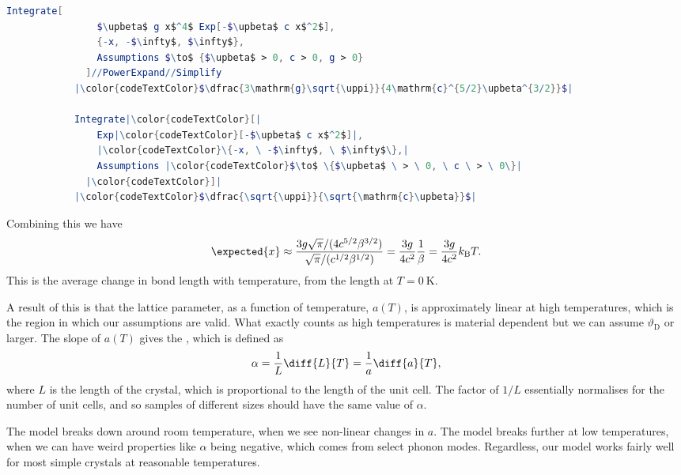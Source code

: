 \documentclass[fleqn]{NotesClass}
\newcommand*{\boltzmann}{k_{\mathrm{B}}}
\newcommand*{\debye}{\mathrm{D}}
\begin{document}
    \begin{cde}{}{}
        \begin{lstlisting}[gobble=12, language=mathematica, mathescape=true,escapechar=|]
            Integrate[
                $\upbeta$ g x$^4$ Exp[-$\upbeta$ c x$^2$],
                {-x, -$\infty$, $\infty$},
                Assumptions $\to$ {$\upbeta$ > 0, c > 0, g > 0}
              ]//PowerExpand//Simplify
            |\color{codeTextColor}$\dfrac{3\mathrm{g}\sqrt{\uppi}}{4\mathrm{c}^{5/2}\upbeta^{3/2}}$|
            
            Integrate|\color{codeTextColor}[|
                Exp|\color{codeTextColor}[-$\upbeta$ c x$^2$]|,
                |\color{codeTextColor}\{-x, \ -$\infty$, \ $\infty$\},|
                Assumptions |\color{codeTextColor}$\to$ \{$\upbeta$ \ > \ 0, \ c \ > \ 0\}|
              |\color{codeTextColor}]|
            |\color{codeTextColor}$\dfrac{\sqrt{\uppi}}{\sqrt{\mathrm{c}\upbeta}}$|
        \end{lstlisting}
    \end{cde}
    
    Combining this we have
    \begin{equation}
        \expected{x} \approx \frac{3g\sqrt{\pi}/(4c^{5/2}\beta^{3/2})}{\sqrt{\pi}/(c^{1/2}\beta^{1/2})} = \frac{3g}{4c^2}\frac{1}{\beta} = \frac{3g}{4c^2}\boltzmann T.
    \end{equation}
    This is the average change in bond length with temperature, from the length at \(T = \qty{0}{\kelvin}\).
    
    A result of this is that the lattice parameter, as a function of temperature, \(a(T)\), is approximately linear at high temperatures, which is the region in which our assumptions are valid.
    What exactly counts as high temperatures is material dependent but we can assume \(\vartheta_{\debye}\) or larger.
    The slope of \(a(T)\) gives the , which is defined as
    \begin{equation}
        \alpha = \frac{1}{L} \diff{L}{T} = \frac{1}{a} \diff{a}{T},
    \end{equation}
    where \(L\) is the length of the crystal, which is proportional to the length of the unit cell.
    The factor of \(1/L\) essentially normalises for the number of unit cells, and so samples of different sizes should have the same value of \(\alpha\).
    
    The model breaks down around room temperature, when we see non-linear changes in \(a\).
    The model breaks further at low temperatures, when we can have weird properties like \(\alpha\) being negative, which comes from select phonon modes.
    Regardless, our model works fairly well for most simple crystals at reasonable temperatures.
    
\end{document}

